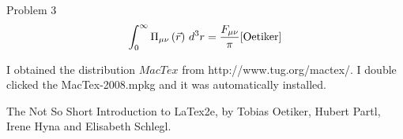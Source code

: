 \documentclass{article}
\begin{document}
Problem 3
 \begin{displaymath}
 \int^\infty_0\Pi_{\mu\nu}\left(\vec{r}\right)\,d^3r=\frac{F_{\mu\nu}}{\pi}\cite{Oetiker}
 \end{displaymath}
 
 I obtained the distribution $MacTex$ from http://www.tug.org/mactex/.  I double clicked the MacTex-2008.mpkg and it was automatically installed.
 
 \vskip4cm
 \begin{thebibliography}{99}
 The Not So Short Introduction to LaTex2e, by Tobias Oetiker, Hubert Partl, Irene Hyna and Elisabeth Schlegl.
 \end{thebibliography}
 
 
\end{document}
